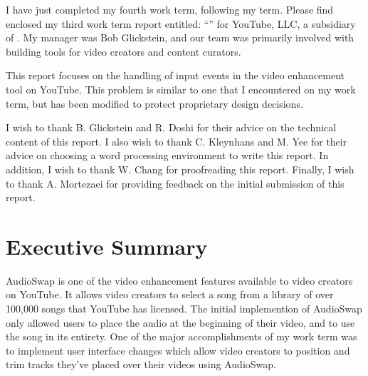 \documentclass[se,resubmit]{uw-wkrpt}
\begin{document}
\frontmatter

\begin{letter}
I have just completed my fourth work term, following my \theterm{} term.  Please
find enclosed my third work term report entitled: ``\thetitle'' for YouTube,
LLC, a subsidiary of \theemployer.  My manager was Bob Glickstein, and our team
was primarily involved with building tools for video creators and content
curators.

This report focuses on the handling of input events in the video enhancement
tool on YouTube. This problem is similar to one that I encountered on my work
term, but has been modified to protect proprietary design decisions.

I wish to thank B. Glickstein and R. Doshi for their advice on the technical
content of this report. I also wish to thank C. Kleynhans and M. Yee for their
advice on choosing a word processing environment to write this report. In
addition, I wish to thank W. Chang for proofreading this report. Finally, I wish
to thank A. Mortezaei for providing feedback on the initial submission of this
report.
\end{letter}

\section{Executive Summary}
AudioSwap is one of the video enhancement features available to video creators
on YouTube. It allows video creators to select a song from a library of over
100,000 songs that YouTube has licensed. The initial implemention of AudioSwap
only allowed users to place the audio at the beginning of their video, and to
use the song in its entirety. One of the major accomplishments of my work term
was to implement user interface changes which allow video creators to position
and trim tracks they've placed over their videos using AudioSwap.
\end{document}
